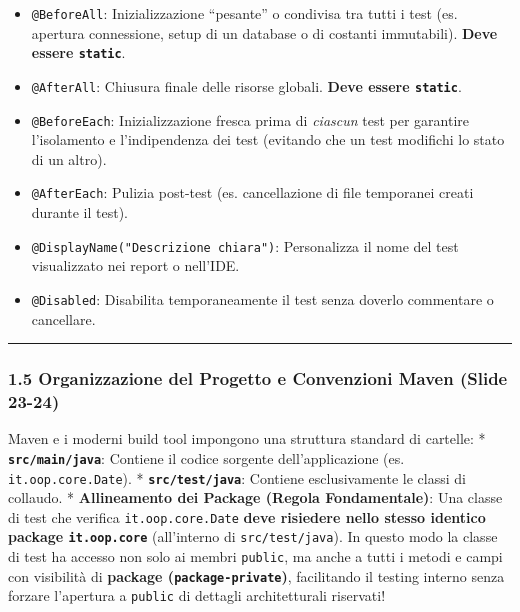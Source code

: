 \documentclass[11pt,a4paper]{article}
\newcommand{\passthrough}[1]{#1}
\providecommand{\tightlist}{\setlength{\itemsep}{0pt}\setlength{\parskip}{0pt}}
\begin{document}
\begin{itemize}
\tightlist
\item
  \passthrough{\lstinline!@BeforeAll!}: Inizializzazione ``pesante'' o
  condivisa tra tutti i test (es. apertura connessione, setup di un
  database o di costanti immutabili). \textbf{Deve essere
  \passthrough{\lstinline!static!}}.
\item
  \passthrough{\lstinline!@AfterAll!}: Chiusura finale delle risorse
  globali. \textbf{Deve essere \passthrough{\lstinline!static!}}.
\item
  \passthrough{\lstinline!@BeforeEach!}: Inizializzazione fresca prima
  di \emph{ciascun} test per garantire l'isolamento e l'indipendenza dei
  test (evitando che un test modifichi lo stato di un altro).
\item
  \passthrough{\lstinline!@AfterEach!}: Pulizia post-test (es.
  cancellazione di file temporanei creati durante il test).
\item
  \passthrough{\lstinline!@DisplayName("Descrizione chiara")!}:
  Personalizza il nome del test visualizzato nei report o nell'IDE.
\item
  \passthrough{\lstinline!@Disabled!}: Disabilita temporaneamente il
  test senza doverlo commentare o cancellare.
\end{itemize}

\begin{center}\rule{0.5\linewidth}{0.5pt}\end{center}

\subsubsection{1.5 Organizzazione del Progetto e Convenzioni Maven
(Slide
23-24)}\label{organizzazione-del-progetto-e-convenzioni-maven-slide-23-24}

Maven e i moderni build tool impongono una struttura standard di
cartelle: * \textbf{\passthrough{\lstinline!src/main/java!}}: Contiene
il codice sorgente dell'applicazione (es.
\passthrough{\lstinline!it.oop.core.Date!}). *
\textbf{\passthrough{\lstinline!src/test/java!}}: Contiene
esclusivamente le classi di collaudo. * \textbf{Allineamento dei Package
(Regola Fondamentale)}: Una classe di test che verifica
\passthrough{\lstinline!it.oop.core.Date!} \textbf{deve risiedere nello
stesso identico package \passthrough{\lstinline!it.oop.core!}}
(all'interno di \passthrough{\lstinline!src/test/java!}). In questo modo
la classe di test ha accesso non solo ai membri
\passthrough{\lstinline!public!}, ma anche a tutti i metodi e campi con
visibilità di \textbf{package
(\passthrough{\lstinline!package-private!})}, facilitando il testing
interno senza forzare l'apertura a \passthrough{\lstinline!public!} di
dettagli architetturali riservati!
\end{document}
